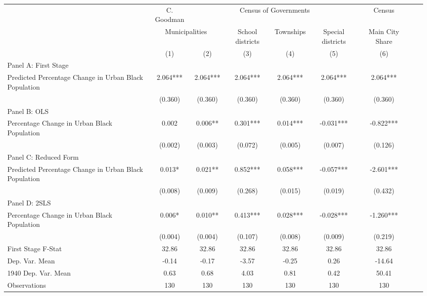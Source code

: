  \begin{tabular}{l*{8}{c}} \toprule
&\multicolumn{1}{c}{C. Goodman}&\multicolumn{4}{c}{Census of Governments}&\multicolumn{1}{c}{Census}\\\cmidrule(lr){2-2}\cmidrule(lr){3-6}\cmidrule(lr){7-7}
&\multicolumn{2}{c}{Municipalities}&\multicolumn{1}{c}{School districts}&\multicolumn{1}{c}{Townships}&\multicolumn{1}{c}{Special districts}&\multicolumn{1}{c}{Main City Share}\\\cmidrule(lr){2-3}\cmidrule(lr){4-6}\cmidrule(lr){7-7}
&\multicolumn{1}{c}{(1)}&\multicolumn{1}{c}{(2)}&\multicolumn{1}{c}{(3)}&\multicolumn{1}{c}{(4)}&\multicolumn{1}{c}{(5)}&\multicolumn{1}{c}{(6)}\\
\cmidrule(lr){1-7}
\multicolumn{6}{l}{Panel A: First Stage}\\
\cmidrule(lr){1-7}
Predicted Percentage Change in Urban Black Population&    2.064***&    2.064***&    2.064***&    2.064***&    2.064***&    2.064***\\
                &  (0.360)   &  (0.360)   &  (0.360)   &  (0.360)   &  (0.360)   &  (0.360)   \\
\cmidrule(lr){1-7}
\multicolumn{6}{l}{Panel B: OLS}\\
\cmidrule(lr){1-7}
Percentage Change in Urban Black Population&    0.002   &    0.006** &    0.301***&    0.014***&   -0.031***&   -0.822***\\
                &  (0.002)   &  (0.003)   &  (0.072)   &  (0.005)   &  (0.007)   &  (0.126)   \\
\cmidrule(lr){1-7}
\multicolumn{6}{l}{Panel C: Reduced Form}\\
\cmidrule(lr){1-7}
Predicted Percentage Change in Urban Black Population&    0.013*  &    0.021** &    0.852***&    0.058***&   -0.057***&   -2.601***\\
                &  (0.008)   &  (0.009)   &  (0.268)   &  (0.015)   &  (0.019)   &  (0.432)   \\
\cmidrule(lr){1-7}
\multicolumn{6}{l}{Panel D: 2SLS}\\
\cmidrule(lr){1-7}
Percentage Change in Urban Black Population&    0.006*  &    0.010** &    0.413***&    0.028***&   -0.028***&   -1.260***\\
                &  (0.004)   &  (0.004)   &  (0.107)   &  (0.008)   &  (0.009)   &  (0.219)   \\
\midrule
First Stage F-Stat&    32.86   &    32.86   &    32.86   &    32.86   &    32.86   &    32.86   \\
Dep. Var. Mean  &    -0.14   &    -0.17   &    -3.57   &    -0.25   &     0.26   &   -14.64   \\
1940 Dep. Var. Mean&     0.63   &     0.68   &     4.03   &     0.81   &     0.42   &    50.41   \\
Observations    &      130   &      130   &      130   &      130   &      130   &      130   \\
 \bottomrule \end{tabular}
